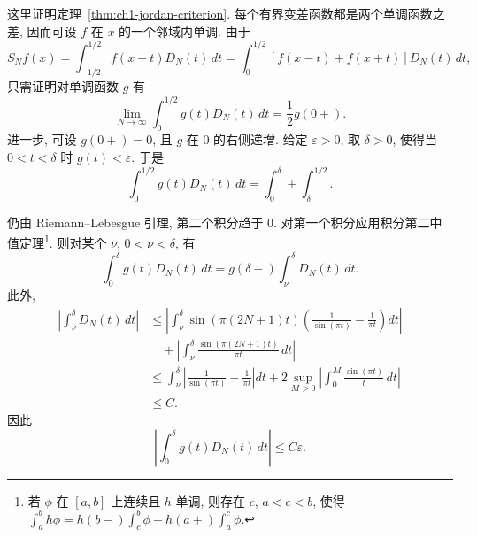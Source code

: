 \begin{Proof}
这里证明定理~\ref{thm:ch1-jordan-criterion}. 每个有界变差函数都是两个单调函数之差, 因而可设 $f$ 在 $x$ 的一个邻域内单调. 由于
\[
 S_Nf(x)=\int_{-1/2}^{1/2}f(x-t)D_N(t)\,dt
 =\int_0^{1/2}[f(x-t)+f(x+t)]D_N(t)\,dt,
\]
只需证明对单调函数 $g$ 有
\[
 \lim_{N\to\infty}\int_0^{1/2}g(t)D_N(t)\,dt=\frac12g(0+).
\]
进一步, 可设 $g(0+)=0$, 且 $g$ 在 $0$ 的右侧递增. 给定 $\varepsilon>0$, 取 $\delta>0$, 使得当 $0<t<\delta$ 时 $g(t)<\varepsilon$. 于是
\[
 \int_0^{1/2}g(t)D_N(t)\,dt=\int_0^\delta+\int_\delta^{1/2}.
\]

\hypertarget{chapter-01-page-018}{}
仍由 Riemann--Lebesgue 引理, 第二个积分趋于 $0$. 对第一个积分应用积分第二中值定理\footnote{若 $\phi$ 在 $[a,b]$ 上连续且 $h$ 单调, 则存在 $c$, $a<c<b$, 使得 $\int_a^bh\phi=h(b-)\int_c^b\phi+h(a+)\int_a^c\phi$.}. 则对某个 $\nu$, $0<\nu<\delta$, 有
\[
 \int_0^\delta g(t)D_N(t)\,dt=g(\delta-)\int_\nu^\delta D_N(t)\,dt.
\]
此外,
\[
\begin{aligned}
 \left|\int_\nu^\delta D_N(t)\,dt\right|
 &\le\left|\int_\nu^\delta\sin(\pi(2N+1)t)
 \left(\frac1{\sin(\pi t)}-\frac1{\pi t}\right)dt\right|\\
 &\quad+\left|\int_\nu^\delta\frac{\sin(\pi(2N+1)t)}{\pi t}\,dt\right|\\
 &\le\int_\nu^\delta\left|\frac1{\sin(\pi t)}-\frac1{\pi t}\right|dt
 +2\sup_{M>0}\left|\int_0^M\frac{\sin(\pi t)}t\,dt\right|\\
 &\le C.
\end{aligned}
\]
因此
\[
 \left|\int_0^\delta g(t)D_N(t)\,dt\right|\le C\varepsilon.
\]
\end{Proof}

